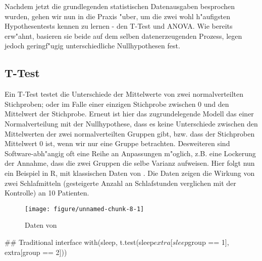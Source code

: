 \documentclass[a4paper,twoside]{tufte-book}\usepackage[]{graphicx}\usepackage[]{color}
\makeatletter
\def\maxwidth{ %
  \ifdim\Gin@nat@width>\linewidth
    \linewidth
  \else
    \Gin@nat@width
  \fi
}
\makeatother
\begin{document}
Nachdem jetzt die grundlegenden statistischen Datenausgaben besprochen wurden, gehen wir nun in die Praxis "uber, um die zwei wohl h"aufigsten Hypothesentests kennen zu lernen - den T-Test und ANOVA. Wie bereits erw"ahnt, basieren sie beide auf dem selben datenerzeugenden Prozess, legen jedoch geringf"ugig unterschiedliche Nullhypothesen fest.

\subsection{T-Test}

Ein T-Test testet die Unterschiede der Mittelwerte von zwei normalverteilten Stichproben; oder im Falle einer einzigen Stichprobe zwischen 0 und den Mittelwert der Stichprobe. Erneut ist hier das zugrundelegende Modell das einer Normalverteilung mit der Nullhypothese, dass es keine Unterschiede zwischen den Mittelwerten der zwei normalverteilten Gruppen gibt, bzw. dass der Stichproben Mittelwert 0 ist, wenn wir nur eine Gruppe betrachten. Desweiteren sind Software-abh"angig oft eine Reihe an Anpassungen m"oglich, z.B. eine Lockerung der Annahme, dass die zwei Gruppen die selbe Varianz aufweisen. Hier folgt nun ein Beispiel in R, mit klassischen Daten von \citet{Student-probableerrormean-1908}. Die Daten zeigen die Wirkung von zwei Schlafmitteln (gesteigerte Anzahl an Schlafstunden verglichen mit der Kontrolle) an 10 Patienten. 

\begin{figure}[htbp]
\begin{center}
\begin{Schunk}

\texttt{[image: figure/unnamed-chunk-8-1]} \end{Schunk}
\caption{Daten von \citet{Student-probableerrormean-1908}}
\label{fig: Student Sleep Data}
\end{center}
\end{figure}

\begin{Schunk}
\begin{Sinput}
## Traditional interface
with(sleep, t.test(sleep$extra[sleep$group == 1], extra[group == 2]))
\end{Sinput}
\end{Schunk}
\end{document}
